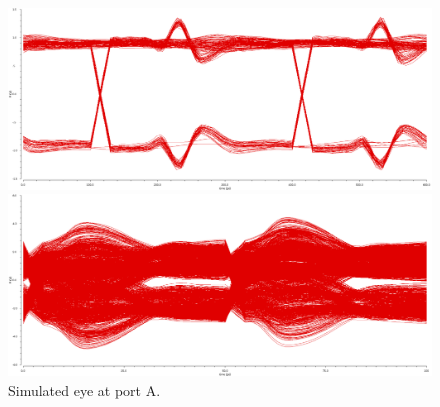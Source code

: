 \documentclass{book}  %
\begin{document}
\begin{paper}
\begin{figure}[htbp!]
	\begin{minipage}[tb]{0.5\textwidth}
		\centering	
		\includegraphics[width=\textwidth]{./img/channel_response_eye_diagram/3gbp_eye_total_before_channel.png}
	\end{minipage}%
	\begin{minipage}[tb]{0.5\textwidth}
		\centering	
		\includegraphics[width=\textwidth]{./img/channel_response_eye_diagram/20gbp_eye_total_before_channel.png}
	\end{minipage}%
	\label{fig:eye_total_port_A}
	\caption{Simulated eye at port A.}
\end{figure}


\end{paper}
\end{document}
